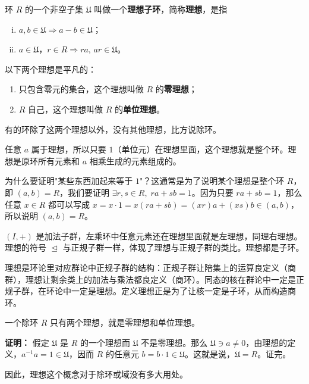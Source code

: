 \begin{definition}[理想子环定义]
环 $R$ 的一个非空子集 $\mathfrak{U}$ 叫做一个\textbf{理想子环}，简称\textbf{理想}，是指
\begin{enumerate}[(i)]
  \item $a,b\in\mathfrak{U}\Rightarrow a-b\in\mathfrak{U}$；
  \item $a\in\mathfrak{U}$，$r\in R\Rightarrow ra,\,ar\in\mathfrak{U}$。
\end{enumerate}

以下两个理想是平凡的：
\begin{enumerate}
  \item 只包含零元的集合，这个理想叫做 $R$ 的\textbf{零理想}；
  \item $R$ 自己，这个理想叫做 $R$ 的\textbf{单位理想}。
\end{enumerate}
有的环除了这两个理想以外，没有其他理想，比方说除环。

任意 $a$ 属于理想，所以只要 $1$（单位元）在理想里面，这个理想就是整个环。理想是原环所有元素和 $a$ 相乘生成的元素组成的。

为什么要证明"某些东西加起来等于 $1$"？这通常是为了说明某个理想是整个环 $R$，即 $(a,b)=R$，我们要证明 $\exists r,s\in R,\;ra+sb=1$。因为只要 $ra+sb=1$，那么任意 $x\in R$ 都可以写成 $x=x\cdot 1=x(ra+sb)=(xr)a+(xs)b\in(a,b)$，所以说明 $(a,b)=R$。
\end{definition}

\begin{note}[定义2 10理想]
$(I,+)$ 是加法子群，左乘环中任意元素还在理想里面就是左理想，同理右理想。理想的符号 $\trianglelefteq$ 与正规子群一样，体现了理想与正规子群的类比。理想都是子环。
\end{note}

\begin{note}[理想与正规子群]
理想是环论里对应群论中正规子群的结构：正规子群让陪集上的运算良定义（商群），理想让剩余类上的加法与乘法都良定义（商环）。同态的核在群论中一定是正规子群，在环论中一定是理想。定义理想正是为了让核一定是子环，从而构造商环。
\end{note}

\begin{theorem}[定理 1：除环只有两个理想]
一个除环 $R$ 只有两个理想，就是零理想和单位理想。

\textbf{证明：} 假定 $\mathfrak{U}$ 是 $R$ 的一个理想而 $\mathfrak{U}$ 不是零理想。那么 $\mathfrak{U}\ni a\ne 0$，由理想的定义，$a^{-1}a=1\in\mathfrak{U}$，因而 $R$ 的任意元 $b=b\cdot 1\in\mathfrak{U}$。这就是说，$\mathfrak{U}=R$。证完。

因此，理想这个概念对于除环或域没有多大用处。
\end{theorem}

